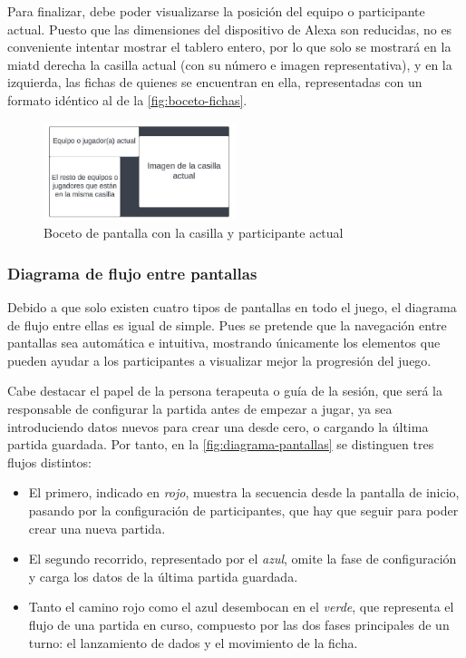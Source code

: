 Para finalizar, debe poder visualizarse la posición del equipo o participante actual. Puesto que las dimensiones del dispositivo de Alexa son reducidas, no es conveniente intentar mostrar el tablero entero, por lo que solo se mostrará en la miatd derecha la casilla actual (con su número e imagen representativa), y en la izquierda, las fichas de quienes se encuentran en ella, representadas con un formato idéntico al de la \autoref{fig:boceto-fichas}.

\begin{figure}[H]
	\centering
	\includegraphics[width=0.5\textwidth]{imgs/boceto-casilla.JPG}
	\caption{Boceto de pantalla con la casilla y participante actual}
	\label{fig:boceto-casilla}
\end{figure}

\newpage

\subsubsection{Diagrama de flujo entre pantallas}

Debido a que solo existen cuatro tipos de pantallas en todo el juego, el diagrama de flujo entre ellas es igual de simple. Pues se pretende que la navegación entre pantallas sea automática e intuitiva, mostrando únicamente los elementos que pueden ayudar a los participantes a visualizar mejor la progresión del juego.

Cabe destacar el papel de la persona terapeuta o guía de la sesión, que será la responsable de configurar la partida antes de empezar a jugar, ya sea introduciendo datos nuevos para crear una desde cero, o cargando la última partida guardada. Por tanto, en la \autoref{fig:diagrama-pantallas} se distinguen tres flujos distintos: 
\begin{itemize}
	\item El primero, indicado en \textit{rojo}, muestra la secuencia desde la pantalla de inicio, pasando por la configuración de participantes, que hay que seguir para poder crear una nueva partida.
	\item El segundo recorrido, representado por el \textit{azul}, omite la fase de configuración y carga los datos de la última partida guardada.
	\item Tanto el camino rojo como el azul desembocan en el \textit{verde}, que representa el flujo de una partida en curso, compuesto por las dos fases principales de un turno: el lanzamiento de dados y el movimiento de la ficha.
\end{itemize}

